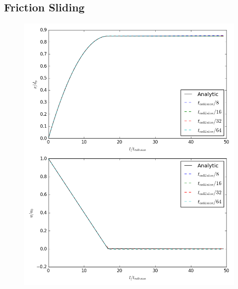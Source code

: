 \documentclass[10pt,a4paper,titlepage]{report}
\begin{document}
\subsection{Friction Sliding}
\begin{figure}[!htb]
\centering
\includegraphics[scale=0.4]{figures/python_verification/friction_verification.png}

\end{figure}
\end{document}
